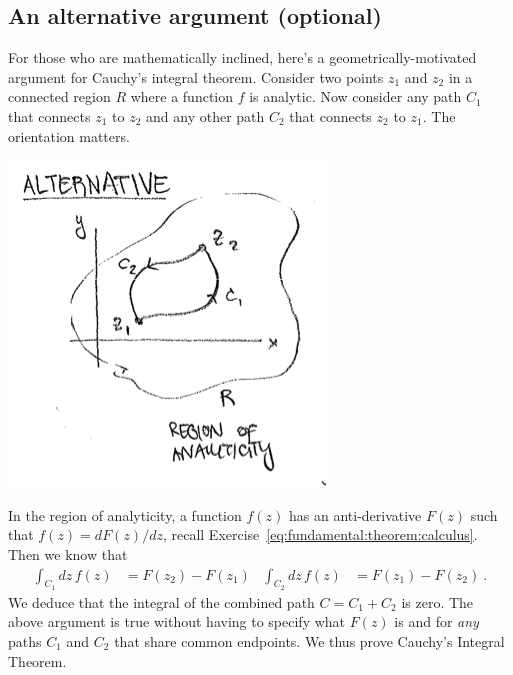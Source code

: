 \subsection{An alternative argument (optional)}
\label{sec:stokes:theorem:aside}


For those who are mathematically inclined, here's a geometrically-motivated argument for Cauchy's integral theorem. Consider two points $z_1$ and $z_2$ in a connected region $R$ where a function $f$ is analytic. Now consider any path $C_1$ that connects $z_1$ to $z_2$ and any other path $C_2$ that connects $z_2$ to $z_1$. The orientation matters.
\begin{center}
\includegraphics[width=.5\textwidth]{figures/Lec_2017_paths.png}
\end{center}
In the region of analyticity, a function $f(z)$ has an anti-derivative $F(z)$ such that $f(z) = dF(z)/dz$, recall Exercise~\ref{eq:fundamental:theorem:calculus}. Then we know that
\begin{align}
	\int_{C_1} dz\, f(z) &= F(z_2) - F(z_1)
	&
	\int_{C_2} dz\, f(z) &= F(z_1) - F(z_2) \ .
\end{align}
We deduce that the integral of the combined path $C=C_1+C_2$ is zero. The above argument is true without having to specify what $F(z)$ is and for \emph{any} paths $C_1$ and $C_2$ that share common endpoints. We thus prove Cauchy's Integral Theorem.

